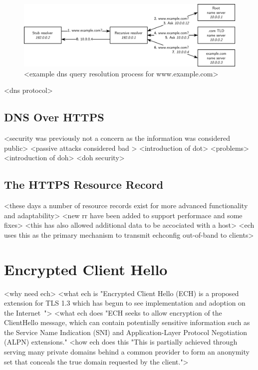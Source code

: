 \begin{figure}[ht]
\centerline{\includegraphics[width=160mm]{images/dns-resolve.png}}
\caption[Example DNS name resolution process]{<example dns query resolution process for www.example.com>}
\label{dns_resolve_figure}
\end{figure}

<dns protocol>

\subsection{DNS Over HTTPS}

<security was previously not a concern as the information was considered public>
<passive attacks considered bad \cite{todo}>
<introduction of dot>
<problems>
<introduction of doh>
<doh security>

\subsection{The HTTPS Resource Record}

<these days a number of resource records exist for more advanced functionality and adaptability>
<new rr have been added to support performace and some fixes\cite{https-rr}>
<this has also allowed additional data to be accociated with a host>
<ech uses this as the primary mechanism to transmit echconfig out-of-band to clients>








\section{Encrypted Client Hello}

<why need ech>
<what ech is "Encrypted Client Hello (ECH) is a proposed extension for TLS 1.3 which has begun to see implementation and adoption on the Internet~\cite{tsiatsikas2022measuring, CF-ECH}">
<what ech does "ECH seeks to allow encryption of the ClientHello message, which can contain potentially sensitive information such as the Service Name Indication (SNI) and Application-Layer Protocol Negotiation (ALPN) extensions."
<how ech does this "This is partially achieved through serving many private domains behind a common provider to form an anonymity set that conceals the true domain requested by the client.">

